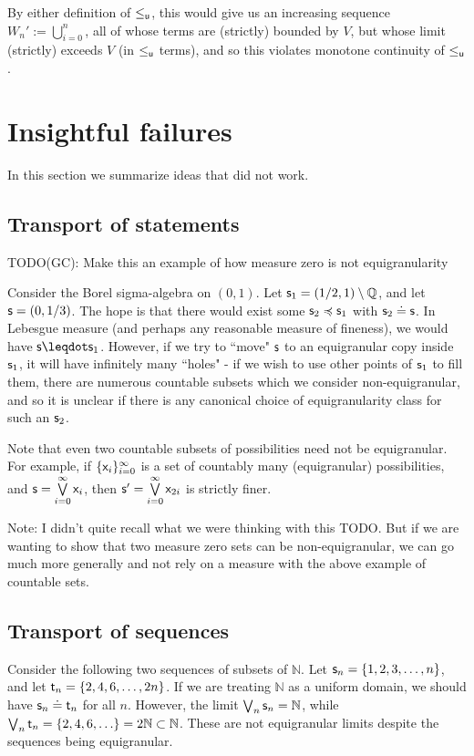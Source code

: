 \documentclass[10pt, onecolumn, longbibliography, nofootinbib]{revtex4-2}
\begin{document}
By either definition of $\lequ$, this would give us an increasing sequence $W_n' := \bigcup\limits_{i=0}^n$, all of whose terms are (strictly) bounded by $V$, but whose limit (strictly) exceeds $V$ (in $\lequ$ terms), and so this violates monotone continuity of $\lequ$. 

\section{Insightful failures}

In this section we summarize ideas that did not work.

\subsection{Transport of statements}

TODO(GC): Make this an example of how measure zero is not equigranularity

Consider the Borel sigma-algebra on $(0,1)$. Let $\stmt_1 = (1/2,1) \setminus \mathbb{Q}$, and let $\stmt = (0,1/3)$. The hope is that there would exist some $\stmt_2\narrower\stmt_1$ with $\stmt_2\eqgran\stmt$. In Lebesgue measure (and perhaps any reasonable measure of fineness), we would have $\stmt\finer\stmt_1$. However, if we try to ``move" $\stmt$ to an equigranular copy inside $\stmt_1$, it will have infinitely many ``holes" - if we wish to use other points of $\stmt_1$ to fill them, there are numerous countable subsets which we consider non-equigranular, and so it is unclear if there is any canonical choice of equigranularity class for such an $\stmt_2$. 

Note that even two countable subsets of possibilities need not be equigranular. For example, if $\{\stmt[x]_i\}_{i=0}^{\infty}$ is a set of countably many (equigranular) possibilities, and $\stmt = \bigOR\limits_{i=0}^{\infty}\stmt[x]_i$, then $\stmt' = \bigOR\limits_{i=0}^{\infty}\stmt[x]_{2i}$ is strictly finer. 

Note: I didn't quite recall what we were thinking with this TODO. But if we are wanting to show that two measure zero sets can be non-equigranular, we can go much more generally and not rely on a measure with the above example of countable sets. 

\subsection{Transport of sequences}

Consider the following two sequences of subsets of $\mathbb{N}$. Let $\stmt_n = \{1,2,3,\ldots,n\}$, and let $\stmt[t]_n = \{2,4,6,\ldots,2n\}$. If we are treating $\mathbb{N}$ as a uniform domain, we should have $\stmt_n\eqgran\stmt[t]_n$ for all $n$. However, the limit $\bigOR_n\stmt_n = \mathbb{N}$, while $\bigOR_n\stmt[t]_n = \{2,4,6,\ldots\} = 2\mathbb{N} \subset \mathbb{N}$. These are not equigranular limits despite the sequences being equigranular. 
\end{document}
